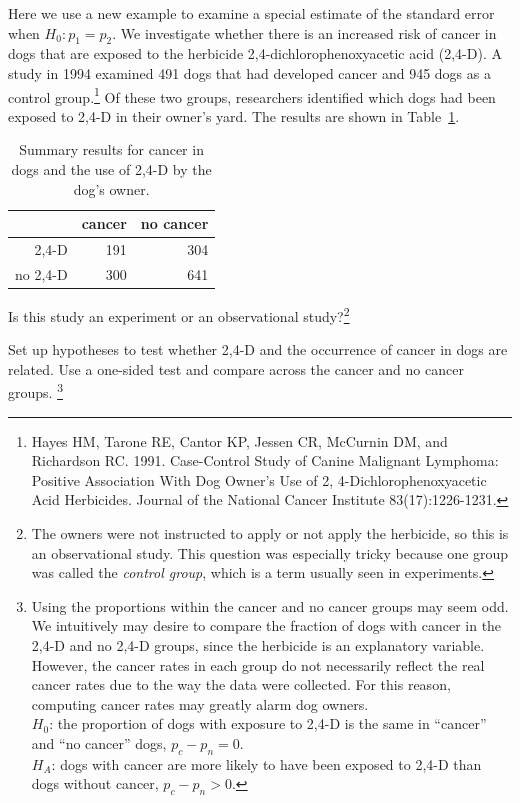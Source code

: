 
Here we use a new example to examine a special estimate of the standard error when $H_0: p_1 = p_2$. We investigate whether there is an increased risk of cancer in dogs that are exposed to the herbicide 2,4-dichlorophenoxyacetic acid (2,4-D). A study in 1994 examined 491 dogs that had developed cancer and 945 dogs as a control group.\footnote{Hayes HM, Tarone RE, Cantor KP, Jessen CR, McCurnin DM, and Richardson RC. 1991. Case-Control Study of Canine Malignant Lymphoma: Positive Association With Dog Owner's Use of 2, 4-Dichlorophenoxyacetic Acid Herbicides. Journal of the National Cancer Institute 83(17):1226-1231.} Of these two groups, researchers identified which dogs had been exposed to 2,4-D in their owner's yard. The results are shown in Table~\ref{24DAndCancerInDogs}.

\begin{table}[h]
\centering
\begin{tabular}{rrr}
  \hline
 & cancer & no cancer \\
  \hline
2,4-D & 191 & 304 \\
no 2,4-D & 300 & 641 \\
   \hline
\end{tabular}
\caption{Summary results for cancer in dogs and the use of 2,4-D by the dog's owner.}
\label{24DAndCancerInDogs}
\end{table}

\begin{exercise}
Is this study an experiment or an observational study?\footnote{The owners were not instructed to apply or not apply the herbicide, so this is an observational study. This question was especially tricky because one group was called the \emph{control group}, which is a term usually seen in experiments.}
\end{exercise}

\begin{exercise}\label{htFor24DAndCancerInDogs}
Set up hypotheses to test whether 2,4-D and the occurrence of cancer in dogs are related. Use a one-sided test and compare across the cancer and no cancer groups.%
\footnote{Using the proportions within the cancer and no cancer groups may seem odd. We intuitively may desire to compare the fraction of dogs with cancer in the 2,4-D and no 2,4-D groups, since the herbicide is an explanatory variable. However, the cancer rates in each group do not necessarily reflect the real cancer rates due to the way the data were collected. For this reason, computing cancer rates may greatly alarm dog owners. \\ $H_0$: the proportion of dogs with exposure to 2,4-D is the same in ``cancer'' and ``no cancer'' dogs, $p_c - p_n = 0$. \\ $H_A$: dogs with cancer are more likely to have been exposed to 2,4-D than dogs without cancer, $p_c - p_n > 0$.}
\end{exercise}

